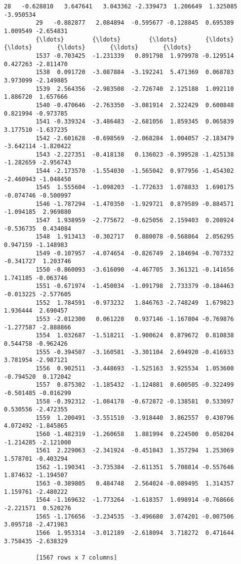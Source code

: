 \documentclass[11pt]{article}
\begin{document}
\begin{Verbatim}[commandchars=\\\{\}]
         28   -0.628810   3.647641   3.043362 -2.339473  1.206649  1.325085 -3.950534
         29   -0.882877   2.084894  -0.595677 -0.128845  0.695389  1.009549 -2.654831
         {\ldots}        {\ldots}        {\ldots}        {\ldots}       {\ldots}       {\ldots}       {\ldots}       {\ldots}
         1537 -0.703425  -1.231339   0.891798  1.979978 -0.129514  0.427263 -2.811470
         1538  0.091720  -3.087884  -3.192241  5.471369  0.068783  3.973099 -2.149885
         1539  2.564356  -2.983508  -2.726740  2.125188  1.092110  1.886720  1.657666
         1540 -0.470646  -2.763350  -3.081914  2.322429  0.600848  0.821994 -0.973785
         1541 -0.339324  -3.486483  -2.681056  1.859345  0.065839  3.177510 -1.637235
         1542 -2.601628  -0.698569  -2.068284  1.004057 -2.183479 -3.642114 -1.820422
         1543 -2.227351  -0.418138   0.136023 -0.399528 -1.425138 -1.282659 -2.956743
         1544 -2.173570  -1.554030  -1.565042  0.977956 -1.454302 -2.460943 -1.048450
         1545  1.555604  -1.098203  -1.772633  1.078833  1.690175 -0.074746 -0.500997
         1546 -1.787294  -1.470350  -1.929721  0.879589 -0.884571 -1.094185  2.969880
         1547  1.938959  -2.775672  -0.625056  2.159403  0.208924 -0.536735  0.434084
         1548  1.913413  -0.302717   0.880078 -0.568864  2.056295  0.947159 -1.148983
         1549 -0.107957  -4.074654  -0.826749  2.184694 -0.707332 -0.341727  1.203746
         1550 -0.860093  -3.616090  -4.467705  3.361321 -0.141656  1.741185 -0.063746
         1551 -0.671974  -1.450034  -1.091798  2.733379 -0.184463 -0.013225 -2.577605
         1552  1.784591  -0.973232   1.846763 -2.748249  1.679823  1.936444  2.690457
         1553 -2.012300   0.061228   0.937146 -1.167804 -0.769876 -1.277587 -2.888866
         1554  1.032687  -1.518211  -1.900624  0.879672  0.810838  0.544758 -0.962426
         1555 -0.394507  -3.160581  -3.301104  2.694920 -0.416933  3.781954 -2.987121
         1556  0.902511  -3.448693  -1.525163  3.925534  1.053600 -0.794520  0.172042
         1557  0.875302  -1.185432  -1.124881  0.600505 -0.322499 -0.501485 -0.016299
         1558 -0.392312  -1.084178  -0.672872 -0.138581  0.533097  0.530556 -2.472355
         1559  1.200491  -3.551510  -3.918440  3.862557  0.430796  4.072492 -1.845865
         1560 -1.482319  -1.260658   1.881994  0.224500  0.058204 -1.214285 -2.121000
         1561  2.229063  -2.341924  -0.451043  1.357294  1.253069  1.578701 -0.403294
         1562 -1.190341  -3.735384  -2.611351  5.708814 -0.557646  1.874632 -1.194507
         1563 -0.389805   0.484748   2.564024 -0.089495  1.314357  1.159761 -2.480222
         1564 -1.169632  -1.773264  -1.618357  1.098914 -0.768666 -2.221571  0.520276
         1565 -1.176656  -3.234535  -3.496680  3.074201 -0.007506  3.095718 -2.471983
         1566  1.953314  -3.012189  -2.618094  3.718272  0.471644  3.758435 -2.638329
         
         [1567 rows x 7 columns]
\end{Verbatim}
            
\end{document}
